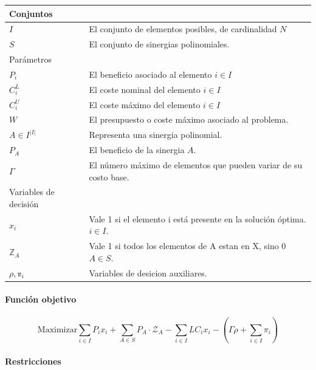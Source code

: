 \documentclass[spanish, a4paper, 12pt, openany,final]{book}
\begin{document}
 \begingroup 
 \renewcommand{\arraystretch}{1.4}
  \begin{table}
  \begin{tabular}{l l}
  	\hline
  	Conjuntos & \\
  	\hline
  	$I$ & El conjunto de elementos posibles, de cardinalidad $N$\\
  	$S$& El conjunto de sinergias polinomiales.\\
  	\hline Parámetros & \\ \hline
  	
  	$P_i$ & El beneficio asociado al elemento $i \in I$ \\
  	$C^L_i$& El coste nominal del elemento $i \in I$    \\
  	$C^U_i$& El coste máximo del elemento $i \in I$     \\
  	$W$& El presupuesto o coste máximo asociado al problema.\\
  	$A \in I^{|I|}$& Representa una sinergia polinomial.\\
  	$P_A$& El beneficio de la sinergia $A$.\\
  	$\Gamma$& El número máximo de elementos que pueden variar de su costo base.\\
  	
  	\hline Variables de decisión &\\ \hline
  	$x_i$ & Vale 1 si el elemento i está presente en la solución óptima. $i\in I$.\\
  	$\mathbb{Z}_A$ & Vale 1 si todos los elementos de A estan en X, sino 0 $A \in S$.\\
  	$\mathbb{\rho}, \mathbb{\pi}_i$ & Variables de desicion auxiliares. \\
  	
  	
  \end{tabular}
  \end{table} 
  
  \endgroup
    
	\paragraph*{Función objetivo}
	
	
	\begin{equation}
		\label{eq:of}
		\text{Maximizar} \sum_{i\in I}{P_ix_i} + \sum_{A\in S} P_A\cdot \mathcal{Z}_A -
		\sum_{i\in I} {LC_{i}x_i} - \left(\Gamma\rho+\sum_{i \in I} \pi_i\right)
	\end{equation}

    \paragraph*{Restricciones}
    
\end{document}
